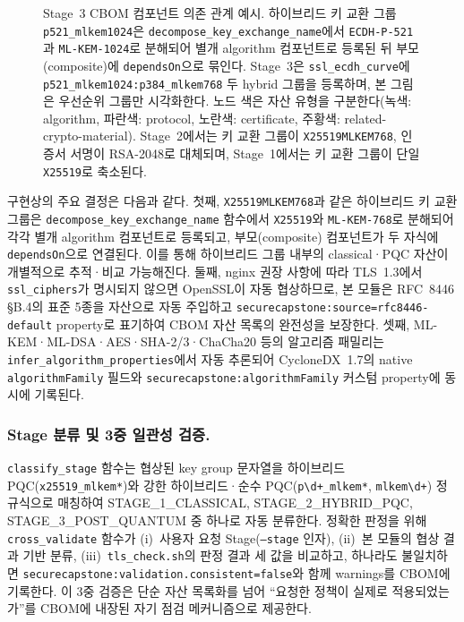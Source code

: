 \begin{figure}[htbp]
\caption{Stage~3 CBOM 컴포넌트 의존 관계 예시. 하이브리드 키 교환 그룹 \texttt{p521\_mlkem1024}은 \texttt{decompose\_key\_exchange\_name}에서 \texttt{ECDH-P-521}과 \texttt{ML-KEM-1024}로 분해되어 별개 algorithm 컴포넌트로 등록된 뒤 부모(composite)에 \texttt{dependsOn}으로 묶인다. Stage~3은 \texttt{ssl\_ecdh\_curve}에 \texttt{p521\_mlkem1024:p384\_mlkem768} 두 hybrid 그룹을 등록하며, 본 그림은 우선순위 그룹만 시각화한다. 노드 색은 자산 유형을 구분한다(녹색: algorithm, 파란색: protocol, 노란색: certificate, 주황색: related-crypto-material). Stage~2에서는 키 교환 그룹이 \texttt{X25519MLKEM768}, 인증서 서명이 RSA-2048로 대체되며, Stage~1에서는 키 교환 그룹이 단일 \texttt{X25519}로 축소된다.}
\label{fig:cbom_graph}
\end{figure}

구현상의 주요 결정은 다음과 같다.
첫째, \texttt{X25519MLKEM768}과 같은 하이브리드 키 교환 그룹은 \texttt{decompose\_key\_exchange\_name} 함수에서 \texttt{X25519}와 \texttt{ML-KEM-768}로 분해되어 각각 별개 algorithm 컴포넌트로 등록되고, 부모(composite) 컴포넌트가 두 자식에 \texttt{dependsOn}으로 연결된다.
이를 통해 하이브리드 그룹 내부의 classical·PQC 자산이 개별적으로 추적·비교 가능해진다.
둘째, nginx 권장 사항에 따라 TLS~1.3에서 \texttt{ssl\_ciphers}가 명시되지 않으면 OpenSSL이 자동 협상하므로, 본 모듈은 RFC~8446 §B.4의 표준 5종을 자산으로 자동 주입하고 \texttt{securecapstone:source=rfc8446-default} property로 표기하여 CBOM 자산 목록의 완전성을 보장한다.
셋째, ML-KEM·ML-DSA·AES·SHA-2/3·ChaCha20 등의 알고리즘 패밀리는 \texttt{infer\_algorithm\_properties}에서 자동 추론되어 CycloneDX~1.7의 native \texttt{algorithmFamily} 필드와 \texttt{securecapstone:algorithmFamily} 커스텀 property에 동시에 기록된다.

\subsubsection{Stage 분류 및 3중 일관성 검증.}

\texttt{classify\_stage} 함수는 협상된 key group 문자열을 하이브리드 PQC(\texttt{x25519\_mlkem*})와 강한 하이브리드·순수 PQC(\texttt{p\textbackslash d+\_mlkem*}, \texttt{mlkem\textbackslash d+}) 정규식으로 매칭하여 STAGE\_1\_CLASSICAL, STAGE\_2\_HYBRID\_PQC, STAGE\_3\_POST\_QUANTUM 중 하나로 자동 분류한다.
정확한 판정을 위해 \texttt{cross\_validate} 함수가 (i)~사용자 요청 Stage(\texttt{--stage} 인자), (ii)~본 모듈의 협상 결과 기반 분류, (iii)~\texttt{tls\_check.sh}의 판정 결과 세 값을 비교하고, 하나라도 불일치하면 \texttt{securecapstone:validation.consistent=false}와 함께 warnings를 CBOM에 기록한다.
이 3중 검증은 단순 자산 목록화를 넘어 ``요청한 정책이 실제로 적용되었는가''를 CBOM에 내장된 자기 점검 메커니즘으로 제공한다.

